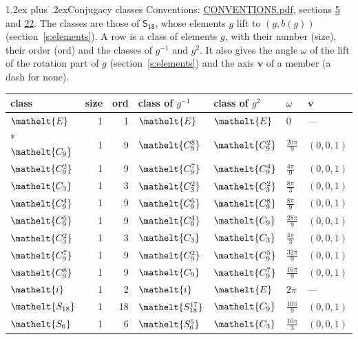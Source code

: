 \documentclass[10pt,a4paper]{article}
\makeatletter
\renewcommand\section{\@startsection{section}{1}{\z@}{-3ex plus -1ex minus -.2ex}%
  {1.2ex plus .2ex}{\normalfont\large\sffamily\bfseries\color{parttitle}}}
\numberwithin{equation}{section}
\newcommand{\eltfont}[1]{{\let\sigma\eltsigma\mathelt{#1}}}
\newcommand{\grp}[1]{\mathsf{#1}}
\newcommand{\cls}[1]{\eltfont{#1}}
\newcommand{\dirvec}[3]{(#1, #2, #3)}
\newcommand{\vv}{\mathbf{v}}
\makeatother
\begin{document}
\section{Conjugacy classes}\label{s:classes}
Conventions: \href{../../CONVENTIONS.pdf}{CONVENTIONS.pdf}, sections \href{../../../rotation/CONVENTIONS.pdf\#conv.5}{5} and \href{../../CONVENTIONS.pdf\#conv.22}{22}.
The classes are those of $\grp{S_{18}}$, whose elements $g$ lift to $(g, b(g))$ (section~\ref{s:elements}).
\leavevmode\label{n:head.size}\label{n:head.classof}A row is a class of elements $g$, with their number (size), their order (ord) and the classes of $g^{-1}$ and $g^{2}$. It also gives the angle $\omega$ of the lift of the rotation part of $g$ (section~\ref{s:elements}) and the axis $\vv$ of a member (a dash for none).
{\renewcommand{\arraystretch}{1.3}\begin{longtable}{@{}lrrllll@{}}\toprule
class & size & ord & class of $g^{-1}$ & class of $g^{2}$ & $\omega$ & $\vv$\\\midrule\endhead
\bottomrule\endfoot\endlastfoot
$\cls{E}$ & 1 & 1 & $\cls{E}$ & $\cls{E}$ & $0$ & ---\\*
$\cls{C_{9}}$ & 1 & 9 & $\cls{C_{9}^{8}}$ & $\cls{C_{9}^{2}}$ & $\tfrac{20\pi}{9}$ & $\dirvec{0}{0}{1}$\\
$\cls{C_{9}^{2}}$ & 1 & 9 & $\cls{C_{9}^{7}}$ & $\cls{C_{9}^{4}}$ & $\tfrac{4\pi}{9}$ & $\dirvec{0}{0}{1}$\\
$\cls{C_{3}}$ & 1 & 3 & $\cls{C_{3}^{2}}$ & $\cls{C_{3}^{2}}$ & $\tfrac{8\pi}{3}$ & $\dirvec{0}{0}{1}$\\
$\cls{C_{9}^{4}}$ & 1 & 9 & $\cls{C_{9}^{5}}$ & $\cls{C_{9}^{8}}$ & $\tfrac{8\pi}{9}$ & $\dirvec{0}{0}{1}$\\
$\cls{C_{9}^{5}}$ & 1 & 9 & $\cls{C_{9}^{4}}$ & $\cls{C_{9}}$ & $\tfrac{28\pi}{9}$ & $\dirvec{0}{0}{1}$\\
$\cls{C_{3}^{2}}$ & 1 & 3 & $\cls{C_{3}}$ & $\cls{C_{3}}$ & $\tfrac{4\pi}{3}$ & $\dirvec{0}{0}{1}$\\
$\cls{C_{9}^{7}}$ & 1 & 9 & $\cls{C_{9}^{2}}$ & $\cls{C_{9}^{5}}$ & $\tfrac{32\pi}{9}$ & $\dirvec{0}{0}{1}$\\
$\cls{C_{9}^{8}}$ & 1 & 9 & $\cls{C_{9}}$ & $\cls{C_{9}^{7}}$ & $\tfrac{16\pi}{9}$ & $\dirvec{0}{0}{1}$\\
$\cls{i}$ & 1 & 2 & $\cls{i}$ & $\cls{E}$ & $2\pi$ & ---\\
$\cls{S_{18}}$ & 1 & 18 & $\cls{S_{18}^{17}}$ & $\cls{C_{9}}$ & $\tfrac{10\pi}{9}$ & $\dirvec{0}{0}{1}$\\
$\cls{S_{6}}$ & 1 & 6 & $\cls{S_{6}^{5}}$ & $\cls{C_{3}}$ & $\tfrac{10\pi}{3}$ & $\dirvec{0}{0}{1}$\\

\end{longtable}}
\end{document}
